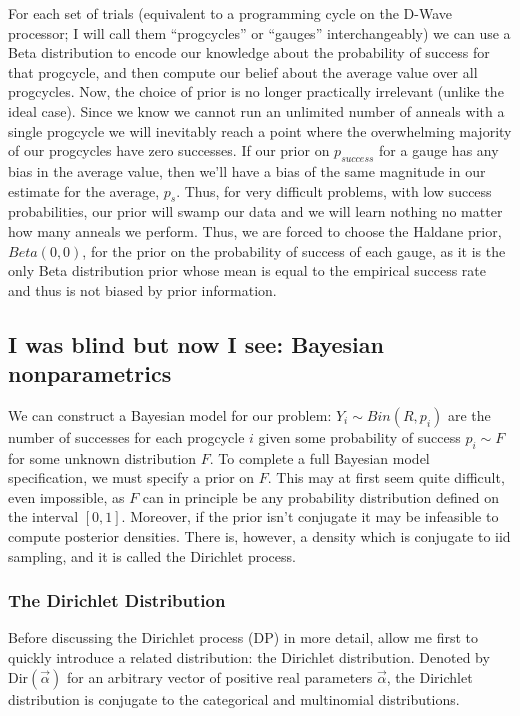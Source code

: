 For each set of trials (equivalent to a programming cycle on the D-Wave processor; I will call them ``progcycles'' or ``gauges'' interchangeably) we can use a Beta distribution to encode our knowledge about the probability of success for that progcycle, and then compute our belief about the average value over all progcycles. Now, the choice of prior is no longer practically irrelevant (unlike the ideal case). Since we know we cannot run an unlimited number of anneals with a single progcycle we will inevitably reach a point where the overwhelming majority of our progcycles have zero successes. If our prior on $p_{success}$ for a gauge has any bias in the average value, then we'll have a bias of the same magnitude in our estimate for the average, $p_s$. Thus, for very difficult problems, with low success probabilities, our prior will swamp our data and we will learn nothing no matter how many anneals we perform. Thus, we are forced to choose the Haldane prior, $Beta(0,0)$, for the prior on the probability of success of each gauge, as it is the only Beta distribution prior whose mean is equal to the empirical success rate and thus is not biased by prior information.

\subsection{I was blind but now I see: Bayesian nonparametrics}

We can construct a Bayesian model for our problem: $Y_i \sim Bin(R,p_i)$ are the number of successes for each progcycle $i$ given some probability of success $p_i \sim F$ for some unknown distribution $F$. To complete a full Bayesian model specification, we must specify a prior on $F$. This may at first seem quite difficult, even impossible, as $F$ can in principle be any probability distribution defined on the interval $[0,1]$. Moreover, if the prior isn't conjugate it may be infeasible to compute posterior densities. There is, however, a density which is conjugate to iid sampling, and it is called the Dirichlet process.

\subsubsection{The Dirichlet Distribution}

Before discussing the Dirichlet process (DP) in more detail, allow me first to quickly introduce a related distribution: the Dirichlet distribution. Denoted by Dir$(\vec{\alpha})$ for an arbitrary vector of positive real parameters $\vec{\alpha}$, the Dirichlet distribution is conjugate to the categorical and multinomial distributions.

